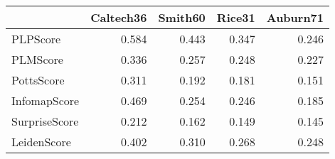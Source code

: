\begin{tabular}{lrrrr}
\toprule
{} & Caltech36 & Smith60 & Rice31 & Auburn71 \\
\midrule
PLPScore      &     0.584 &   0.443 &  0.347 &    0.246 \\
PLMScore      &     0.336 &   0.257 &  0.248 &    0.227 \\
PottsScore    &     0.311 &   0.192 &  0.181 &    0.151 \\
InfomapScore  &     0.469 &   0.254 &  0.246 &    0.185 \\
SurpriseScore &     0.212 &   0.162 &  0.149 &    0.145 \\
LeidenScore   &     0.402 &   0.310 &  0.268 &    0.248 \\
\bottomrule
\end{tabular}
